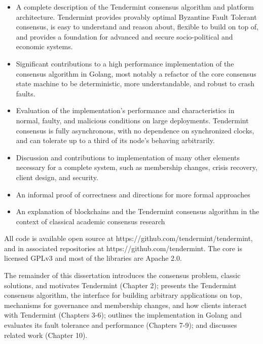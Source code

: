 \begin{itemize}  

    \item A complete description of the Tendermint consensus algorithm and platform architecture. Tendermint provides provably optimal Byzantine Fault Tolerant consensus, is easy to understand and reason about, flexible to build on top of, and provides a foundation for advanced and secure socio-political and economic systems. 

    \item Significant contributions to a high performance implementation of the consensus algorithm in Golang, most notably a refactor of the core consensus state machine to be deterministic, more understandable, and robust to crash faults. 

    \item Evaluation of the implementation's performance and characteristics in normal, faulty, and malicious conditions on large deployments. Tendermint consensus is fully asynchronous, with no dependence on synchronized clocks, and can tolerate up to a third of its node's behaving arbitrarily. 

    \item Discussion and contributions to implementation of many other elements necessary for a complete system, such as membership changes, crisis recovery, client design, and security.

    \item An informal proof of correctness and directions for more formal approaches

    \item An explanation of blockchains and the Tendermint consensus algorithm in the context of classical academic consensus research 
\end{itemize}

All code is available open source at https://github.com/tendermint/tendermint, and in associated repositories at https://github.com/tendermint. 
The core is licensed GPLv3 and most of the libraries are Apache 2.0.

The remainder of this dissertation introduces the consensus problem, classic solutions, and motivates Tendermint (Chapter 2);
presents the Tendermint consensus algorithm, the interface for building arbitrary applications on top, mechanisms for governance and membership changes, 
and how clients interact with Tendermint (Chapters 3-6); 
outlines the implementation in Golang and evaluates its fault tolerance and performance (Chapters 7-9);
and discusses related work (Chapter 10).
